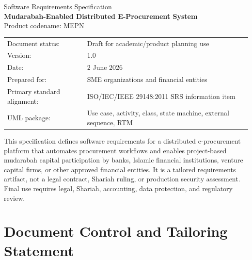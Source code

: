 \documentclass[11pt,a4paper]{article}
\newcommand{\systemshort}{MEPN}
\begin{document}
\begin{titlepage}
\centering
\vspace*{1.0cm}
{\Large Software Requirements Specification\\[0.4cm]}
{\huge \textbf{Mudarabah-Enabled Distributed E-Procurement System}\\[0.35cm]}
{\Large Product codename: \systemshort{}\\[0.8cm]}
\vspace{0.8cm}
\begin{tabular}{ll}
Document status: & Draft for academic/product planning use \\
Version: & 1.0 \\
Date: & 2 June 2026 \\
Prepared for: & SME organizations and financial entities \\
Primary standard alignment: & ISO/IEC/IEEE 29148:2011 SRS information item \\
UML package: & Use case, activity, class, state machine, external sequence, RTM \\
\end{tabular}
\vfill
\begin{minipage}{0.86\textwidth}
\small
This specification defines software requirements for a distributed e-procurement platform that automates procurement workflows and enables project-based mudarabah capital participation by banks, Islamic financial institutions, venture capital firms, or other approved financial entities. It is a tailored requirements artifact, not a legal contract, Shariah ruling, or production security assessment. Final use requires legal, Shariah, accounting, data protection, and regulatory review.
\end{minipage}
\vfill
\end{titlepage}

\tableofcontents
\listoffigures
\listoftables
\clearpage
{}

\section{Document Control and Tailoring Statement}
\end{document}
